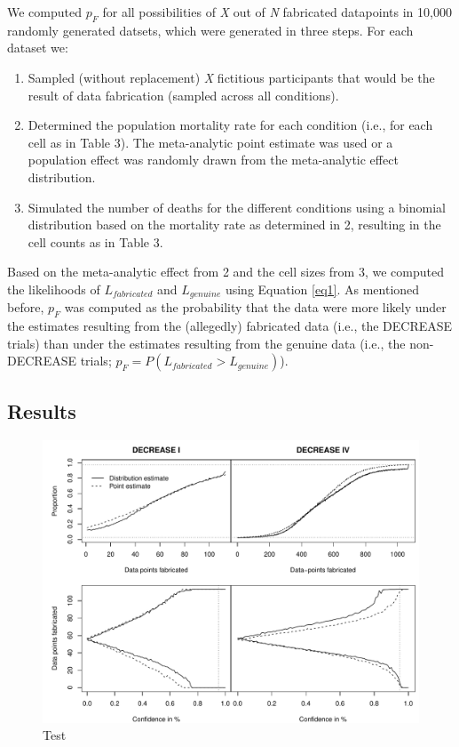 \documentclass[]{article}
\begin{document}
We computed \(p_F\) for all possibilities of \emph{X} out of \emph{N}
fabricated datapoints in 10,000 randomly generated datsets, which were
generated in three steps. For each dataset we:

\begin{enumerate}
\def\labelenumi{\arabic{enumi}.}
\item
  Sampled (without replacement) \emph{X} fictitious participants that
  would be the result of data fabrication (sampled across all
  conditions).
\item
  Determined the population mortality rate for each condition (i.e., for
  each cell as in Table 3). The meta-analytic point estimate was used or
  a population effect was randomly drawn from the meta-analytic effect
  distribution.
\item
  Simulated the number of deaths for the different conditions using a
  binomial distribution based on the mortality rate as determined in 2,
  resulting in the cell counts as in Table 3.
\end{enumerate}

Based on the meta-analytic effect from 2 and the cell sizes from 3, we
computed the likelihoods of \(L_{fabricated}\) and \(L_{genuine}\) using
Equation \ref{eq1}. As mentioned before, \(p_F\) was computed as the
probability that the data were more likely under the estimates resulting
from the (allegedly) fabricated data (i.e., the DECREASE trials) than
under the estimates resulting from the genuine data (i.e., the
non-DECREASE trials; \(p_F=P(L_{fabricated}>L_{genuine})\)).

\subsection{Results}\label{results-2}

\begin{figure}

{\centering \includegraphics[width=0.8\linewidth]{../figures/fig3} 

}

\caption{Test}\label{fig:figure 3}
\end{figure}
\end{document}
